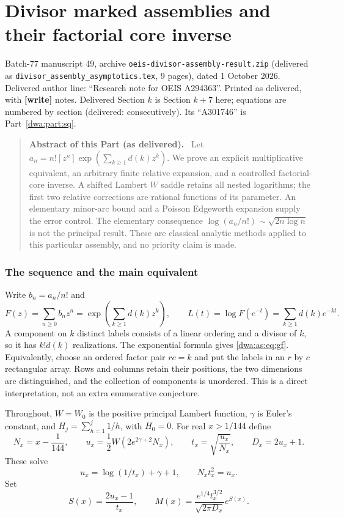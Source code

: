 \documentclass[11pt,letterpaper]{article}
\newcommand{\file}[1]{\nolinkurl{#1}}
\numberwithin{equation}{section}
\theoremstyle{remark}
\newenvironment{partabstract}{\begin{quote}\small\noindent\textbf{Abstract of this Part (as delivered).}\ }{\end{quote}}
\newcommand{\partsource}[1]{\par\noindent\begin{minipage}{\textwidth}\small #1\end{minipage}\par\medskip}
\begin{document}
\part{Divisor marked assemblies and their factorial core inverse}\label{dwa:part:as}
\partsource{Batch-77 manuscript 49, archive \file{oeis-divisor-assembly-result.zip} (delivered as \file{divisor_assembly_asymptotics.tex}, 9 pages), dated 1 October 2026. Delivered author line: ``Research note for OEIS A294363''. Printed as delivered, with \textbf{[write]} notes. Delivered Section $k$ is Section $k+7$ here; equations are numbered by section (delivered: consecutively). Its ``A301746'' is Part~\ref{dwa:part:sq}.}
\begin{partabstract}
Let $a_n=n![z^n]\exp(\sum_{k\ge1}d(k)z^k)$. We prove an explicit multiplicative equivalent, an arbitrary finite relative expansion, and a controlled factorial-core inverse. A shifted Lambert $W$ saddle retains all nested logarithms; the first two relative corrections are rational functions of its parameter. An elementary minor-arc bound and a Poisson Edgeworth expansion supply the error control. The elementary consequence $\log(a_n/n!)\sim\sqrt{2n\log n}$ is not the principal result. These are classical analytic methods applied to this particular assembly, and no priority claim is made.
\end{partabstract}
\section{The sequence and the main equivalent}
Write $b_n=a_n/n!$ and
\begin{equation}\label{dwa:as:eq:gf}
 F(z)=\sum_{n\ge0}b_nz^n=\exp\left(\sum_{k\ge1}d(k)z^k\right),\qquad
 L(t)=\log F(e^{-t})=\sum_{k\ge1}d(k)e^{-kt}.
\end{equation}
A component on $k$ distinct labels consists of a linear ordering and a divisor of $k$, so it has $k!d(k)$ realizations. The exponential formula gives \eqref{dwa:as:eq:gf}. Equivalently, choose an ordered factor pair $r c=k$ and put the labels in an $r$ by $c$ rectangular array. Rows and columns retain their positions, the two dimensions are distinguished, and the collection of components is unordered. This is a direct interpretation, not an extra enumerative conjecture.

Throughout, $W=W_0$ is the positive principal Lambert function, $\gamma$ is Euler's constant, and $H_j=\sum_{h=1}^j1/h$, with $H_0=0$. For real $x>1/144$ define
\begin{equation}\label{dwa:as:eq:params}
 N_x=x-\frac1{144},\qquad
 u_x=\frac12W\left(2e^{2\gamma+2}N_x\right),\qquad
 t_x=\sqrt{\frac{u_x}{N_x}},\qquad D_x=2u_x+1.
\end{equation}
These solve
\begin{equation}\label{dwa:as:eq:saddlecore}
 u_x=\log(1/t_x)+\gamma+1,\qquad N_xt_x^2=u_x.
\end{equation}
Set
\begin{equation}\label{dwa:as:eq:main}
 S(x)=\frac{2u_x-1}{t_x},\qquad
 M(x)=\frac{e^{1/4}t_x^{3/2}}{\sqrt{2\pi D_x}}e^{S(x)}.
\end{equation}
\end{document}
